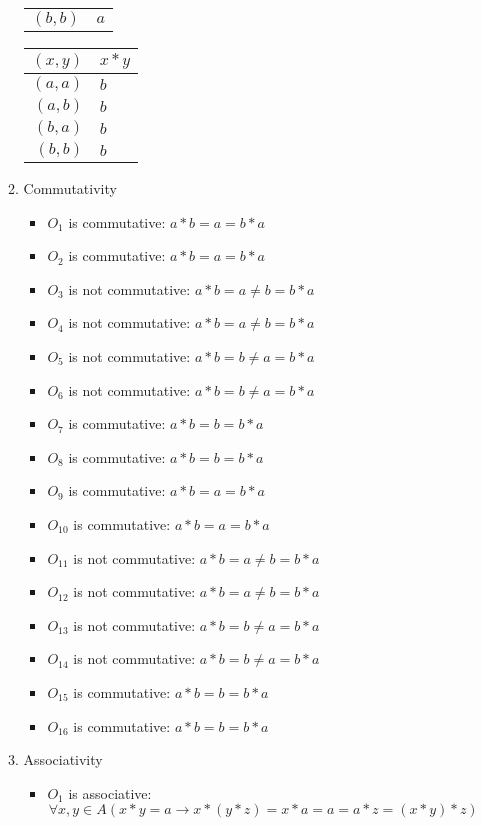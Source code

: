 \begin{enumerate}[label={\Alph*.},font={\bfseries}]
\begin{enumerate}[label={\arabic*},font={\bfseries}]
\begin{minipage}[h]{.25\textwidth}
\begin{tabular}{ r | l }
        $(b,b)$ & $a$
      \end{tabular}
    \end{minipage}
    \begin{minipage}[h]{.25\textwidth}
      \begin{tabular}{ r | l }
        $(x,y)$ & $x*y$ \\
        \hline
        $(a,a)$ & $b$ \\
        $(a,b)$ & $b$ \\
        $(b,a)$ & $b$ \\
        $(b,b)$ & $b$
      \end{tabular}
    \end{minipage}
  \item Commutativity
    \begin{itemize}
    \item $O_1$ is commutative: $a*b=a=b*a$
    \item $O_2$ is commutative: $a*b=a=b*a$
    \item $O_3$ is not commutative: $a*b=a \neq b=b*a$
    \item $O_4$ is not commutative: $a*b=a \neq b=b*a$
    \item $O_5$ is not commutative: $a*b=b \neq a=b*a$
    \item $O_6$ is not commutative: $a*b=b \neq a=b*a$
    \item $O_7$ is commutative: $a*b=b=b*a$
    \item $O_8$ is commutative: $a*b=b=b*a$
    \item $O_9$ is commutative: $a*b=a=b*a$
    \item $O_{10}$ is commutative: $a*b=a=b*a$
    \item $O_{11}$ is not commutative: $a*b=a \neq b=b*a$
    \item $O_{12}$ is not commutative: $a*b=a \neq b=b*a$
    \item $O_{13}$ is not commutative: $a*b=b \neq a=b*a$
    \item $O_{14}$ is not commutative: $a*b=b \neq a=b*a$
    \item $O_{15}$ is commutative: $a*b=b=b*a$
    \item $O_{16}$ is commutative: $a*b=b=b*a$
    \end{itemize}
  \item Associativity
    \begin{itemize}
    \item $O_1$ is associative:
      $$\forall x,y \in A (x*y=a \to x*(y*z)=x*a=a=a*z=(x*y)*z)$$

\end{itemize}
\end{enumerate}
\end{enumerate}
